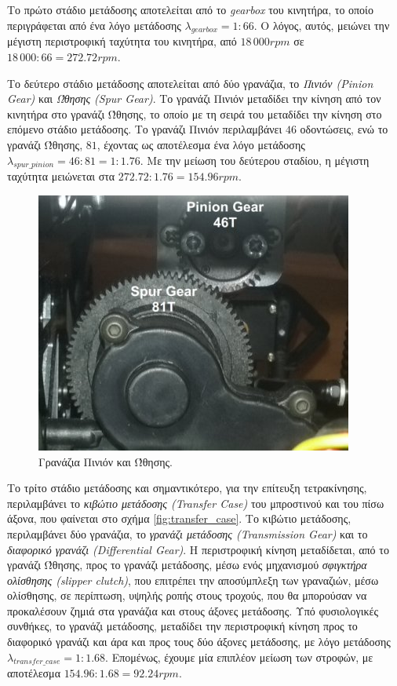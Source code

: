 \bigskip
Το πρώτο στάδιο μετάδοσης αποτελείται από το \textit{gearbox} του κινητήρα, το οποίο περιγράφεται από ένα λόγο μετάδοσης $\lambda_{gearbox}=1:66$. Ο λόγος, αυτός, μειώνει την μέγιστη περιστροφική ταχύτητα του κινητήρα, από $18\,000rpm$ σε $18\,000:66=272.72rpm$.

\bigskip
Το δεύτερο στάδιο μετάδοσης αποτελείται από δύο γρανάζια, το \textit{Πινιόν (Pinion Gear)} και \textit{Ώθησης (Spur Gear)}. Το {γρανάζι Πινιόν} μεταδίδει την κίνηση από τον κινητήρα στο {γρανάζι Ώθησης}, το οποίο με τη σειρά του μεταδίδει την κίνηση στο επόμενο στάδιο μετάδοσης. Το {γρανάζι Πινιόν} περιλαμβάνει $46$ οδοντώσεις, ενώ το {γρανάζι Ώθησης}, $81$, έχοντας ως αποτέλεσμα ένα λόγο μετάδοσης $\lambda_{spur\_pinion}=46:81=1:1.76$. Με την μείωση του δεύτερου σταδίου, η μέγιστη ταχύτητα μειώνεται στα $272.72:1.76 = 154.96rpm$.

\begin{figure}[!ht]
	\centering
	\includegraphics[width=0.4\linewidth]{Chapters/Chapter2/Figures/spur_and_pinion_gears.jpg}
	\caption{Γρανάζια Πινιόν και Ώθησης.}
	\label{fig:spur_pinion_gears}
\end{figure}

\bigskip
Το τρίτο στάδιο μετάδοσης και σημαντικότερο, για την επίτευξη {τετρακίνησης}, περιλαμβάνει το \textit{κιβώτιο μετάδοσης (Transfer Case)} του μπροστινού και του πίσω άξονα, που φαίνεται στο σχήμα \ref{fig:transfer_case}. Το {κιβώτιο μετάδοσης}, περιλαμβάνει δύο γρανάζια, το \textit{γρανάζι μετάδοσης (Transmission Gear)} και το \textit{διαφορικό γρανάζι (Differential Gear)}. Η περιστροφική κίνηση μεταδίδεται, από το {γρανάζι Ώθησης}, προς το {γρανάζι μετάδοσης}, μέσω ενός μηχανισμού \textit{σφιγκτήρα ολίσθησης (slipper clutch)}, που επιτρέπει την αποσύμπλεξη των γραναζιών, μέσω ολίσθησης, σε περίπτωση, υψηλής ροπής στους τροχούς, που θα μπορούσαν να προκαλέσουν ζημιά στα γρανάζια και στους άξονες μετάδοσης. Υπό φυσιολογικές συνθήκες, το {γρανάζι μετάδοσης}, μεταδίδει την περιστροφική κίνηση προς το {διαφορικό γρανάζι} και άρα και προς τους δύο άξονες μετάδοσης, με λόγο μετάδοσης $\lambda_{transfer\_case}=1:1.68$. Επομένως, έχουμε μία επιπλέον μείωση των στροφών, με αποτέλεσμα $154.96:1.68=92.24rpm$.

